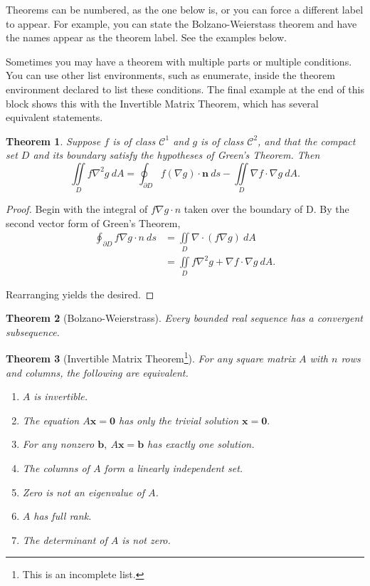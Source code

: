 Theorems can be numbered, as the one below is, or you can force a different label to appear. For example, you can state the Bolzano-Weierstass theorem and have the names appear as the theorem label. See the examples below.

Sometimes you may have a theorem with multiple parts or multiple conditions. You can use other list environments, such as enumerate, inside the theorem environment declared to list these conditions. The final example at the end of this block shows this with the Invertible Matrix Theorem, which has several equivalent statements.

\newtheorem{thm}{Theorem}
\begin{thm}
	Suppose $f$ is of class $\mathcal{C}^1$ and $g$ is of class $\mathcal{C}^2$, and that the compact set $D$ and its boundary satisfy the hypotheses of Green's Theorem.  Then
	\[ \iint \limits_D f\nabla^2 g \ dA = \oint_{\partial D} f(\nabla g) \cdot \mathbf{n} \ ds - \iint \limits_D \nabla f \cdot \nabla g \ dA . \]
\end{thm}

\begin{proof}
	Begin with the integral of $f\nabla g \cdot n$ taken over the boundary of D.  By the second vector form of Green's Theorem,
	\begin{align*}
	\oint_{\partial D} f\nabla g \cdot n \ ds &= \iint \limits_D \nabla \cdot (f\nabla g) \ dA \\
	&= \iint \limits_D f\nabla^2 g + \nabla f \cdot \nabla g \ dA.
	\end{align*}
	
	Rearranging yields the desired.
\end{proof}

\begin{thm}[Bolzano-Weierstrass]
	Every bounded real sequence has a convergent subsequence.
\end{thm}

\begin{thm}[Invertible Matrix Theorem\footnote{This is an incomplete list.}]
	For any square matrix $A$ with $n$ rows and columns, the following are equivalent.
	\begin{enumerate}
		\item $A$ is invertible.
		\item The equation $A\mathbf{x}=\mathbf{0}$ has only the trivial solution $\mathbf{x} = \mathbf{0}.$
		\item For any nonzero $\mathbf{b}, \ A\mathbf{x} = \mathbf{b}$ has exactly one solution.
		\item The columns of $A$ form a linearly independent set.
		\item Zero is not an eigenvalue of $A$.
		\item $A$ has full rank.
		\item The determinant of $A$ is not zero.
	\end{enumerate}
\end{thm}

